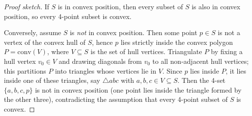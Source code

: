 \documentclass[10pt,a4paper]{amsart}
\begin{document}
\begin{proof}[Proof sketch]
If $S$ is in convex position, then every subset of $S$ is also in convex position, so every 4-point subset is convex.

Conversely, assume $S$ is \emph{not} in convex position. Then some point $p\in S$ is not a vertex of the convex hull of $S$, hence $p$ lies strictly inside the convex polygon $P=\mathrm{conv}(V)$, where $V\subseteq S$ is the set of hull vertices.
Triangulate $P$ by fixing a hull vertex $v_0\in V$ and drawing diagonals from $v_0$ to all non-adjacent hull vertices; this partitions $P$ into triangles whose vertices lie in $V$.
Since $p$ lies inside $P$, it lies inside one of these triangles, say $\triangle abc$ with $a,b,c\in V\subseteq S$.
Then the 4-set $\{a,b,c,p\}$ is not in convex position (one point lies inside the triangle formed by the other three), contradicting the assumption that every 4-point subset of $S$ is convex.
\end{proof}
\end{document}
